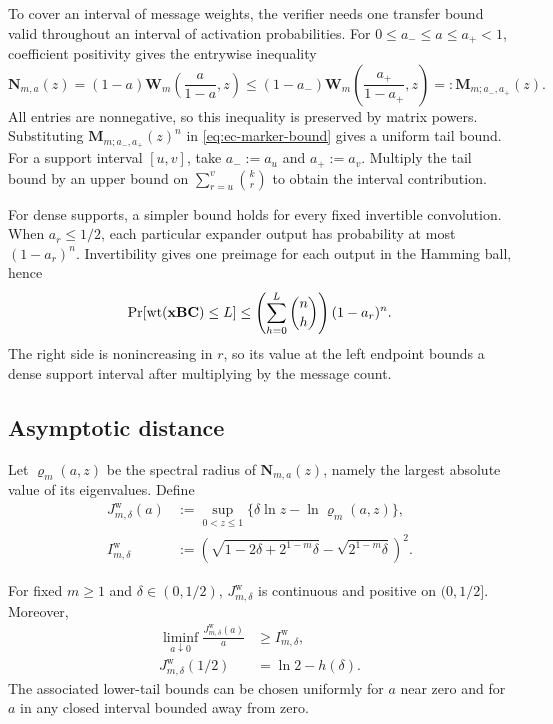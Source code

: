 To cover an interval of message weights, the verifier needs one transfer
bound valid throughout an interval of activation probabilities.
For $0\leq a_-\leq a\leq a_+<1$, coefficient positivity gives the
entrywise inequality
\begin{equation}
 \mathbf N_{m,a}(z)
 =(1-a)\mathbf W_m\!\left(\frac{a}{1-a},z\right)
 \leq(1-a_-)\mathbf W_m\!\left(\frac{a_+}{1-a_+},z\right)
 =:\mathbf M_{m;a_-,a_+}(z).
 \label{eq:ec-uniform-transfer}
\end{equation}
All entries are nonnegative, so this inequality is preserved by matrix
powers.  Substituting $\mathbf M_{m;a_-,a_+}(z)^n$ in
\eqref{eq:ec-marker-bound} gives a uniform tail bound.
For a support interval $[u,v]$, take $a_-:=a_u$ and $a_+:=a_v$.
Multiply the tail bound by an upper bound on
$\sum_{r=u}^{v}\binom{k}{r}$ to obtain the interval contribution.

For dense supports, a simpler bound holds for every fixed invertible
convolution.  When $a_r\leq1/2$, each particular expander output has
probability at most $(1-a_r)^n$.  Invertibility gives one preimage for each
output in the Hamming ball, hence
\begin{equation}
 \Pr[\operatorname{wt}(\mathbf x\mathbf B\mathbf C)\leq L]
 \leq\left(\sum_{h=0}^{L}\binom nh\right)(1-a_r)^n.
 \label{eq:ec-bernoulli-dense}
\end{equation}
The right side is nonincreasing in $r$, so its value at the left endpoint
bounds a dense support interval after multiplying by the message count.

\subsection{Asymptotic distance}

Let $\varrho_m(a,z)$ be the spectral radius of
$\mathbf N_{m,a}(z)$, namely the largest absolute value of its eigenvalues.
Define
\begin{align}
 J^{\mathrm w}_{m,\delta}(a)
 &:=\sup_{0<z\leq1}
 \{\delta\ln z-\ln\varrho_m(a,z)\},
 \label{eq:ec-rate-function}\\
 I^{\mathrm w}_{m,\delta}
 &:=\left(
 \sqrt{1-2\delta+2^{1-m}\delta}
 -\sqrt{2^{1-m}\delta}
 \right)^2.
 \label{eq:ec-sparse-rate}
\end{align}

\begin{lemma}
\label{lem:ec-endpoints}
For fixed $m\geq1$ and $\delta\in(0,1/2)$,
$J^{\mathrm w}_{m,\delta}$ is continuous and positive on $(0,1/2]$.
Moreover,
\begin{align}
 \liminf_{a\downarrow0}
 \frac{J^{\mathrm w}_{m,\delta}(a)}a
 &\geq I^{\mathrm w}_{m,\delta},
 \label{eq:ec-sparse-endpoint}\\
 J^{\mathrm w}_{m,\delta}(1/2)
 &=\ln2-h(\delta).
 \label{eq:ec-dense-endpoint}
\end{align}
The associated lower-tail bounds can be chosen uniformly for $a$ near zero
and for $a$ in any closed interval bounded away from zero.
\end{lemma}

